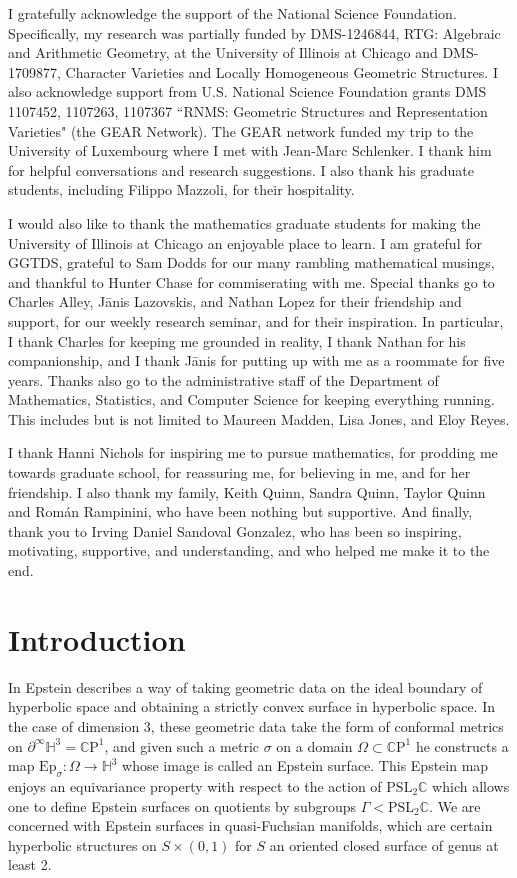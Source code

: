 \documentclass{amsart}
\newcommand{\C}{\mathbb{C}}
\newcommand{\CP}{\mathbb{C}\mathrm{P}}
\renewcommand{\H}{\mathbb{H}}
\begin{document}
I gratefully acknowledge the support of the National Science Foundation. Specifically, my research was partially funded by DMS-1246844, RTG: Algebraic and Arithmetic Geometry, at the University of Illinois at Chicago and DMS-1709877, Character Varieties and Locally Homogeneous Geometric Structures. 
I also acknowledge support from U.S. National Science Foundation grants DMS 1107452, 1107263, 1107367 ``RNMS: Geometric Structures and Representation Varieties" (the GEAR Network).
The GEAR network funded my trip to the University of Luxembourg where I met with Jean-Marc Schlenker. 
I thank him for helpful conversations and research suggestions.
I also thank his graduate students, including Filippo Mazzoli, for their hospitality.  

I would also like to thank the mathematics graduate students for making the University of Illinois at Chicago an enjoyable place to learn. 
I am grateful for GGTDS, grateful to Sam Dodds for our many rambling mathematical musings, and thankful to Hunter Chase for commiserating with me. 
Special thanks go to Charles Alley, J\=anis Lazovskis, and Nathan Lopez for their friendship and support, for our weekly research seminar, and for their inspiration.
In particular, I thank Charles for keeping me grounded in reality, I thank Nathan for his companionship, and I thank J\=anis for putting up with me as a roommate for five years. 
Thanks also go to the administrative staff of the Department of Mathematics, Statistics, and Computer Science for keeping everything running. This includes but is not limited to Maureen Madden, Lisa Jones, and Eloy Reyes.

I thank Hanni Nichols for inspiring me to pursue mathematics, for prodding me towards graduate school, for reassuring me, for believing in me, and for her friendship.
I also thank my family, Keith Quinn, Sandra Quinn, Taylor Quinn and Rom\'an Rampinini, who have been nothing but supportive. 
And finally, thank you to Irving Daniel Sandoval Gonzalez, who has been so inspiring, motivating, supportive, and understanding, and who helped me make it to the end.



\section{Introduction}


In \cite{epstein1984} Epstein describes a way of taking geometric data on the ideal boundary of hyperbolic space and obtaining a strictly convex surface in hyperbolic space. 
In the case of dimension 3, these geometric data take the form of conformal metrics on $\partial^\infty \H^3 = \CP^1$, and given such a metric $\sigma$ on a domain $\Omega \subset \CP^1$ he constructs a map $\mathrm{Ep}_\sigma: \Omega \to \H^3$ whose image is called an Epstein surface.
This Epstein map enjoys an equivariance property with respect to the action of $\mathrm{PSL}_2\C$ which allows one to define Epstein surfaces on quotients by subgroups $\Gamma < \mathrm{PSL}_2\C$.
We are concerned with Epstein surfaces in quasi-Fuchsian manifolds, which are certain hyperbolic structures on $S \times (0,1)$ for $S$ an oriented closed surface of genus at least 2. 
\end{document}
